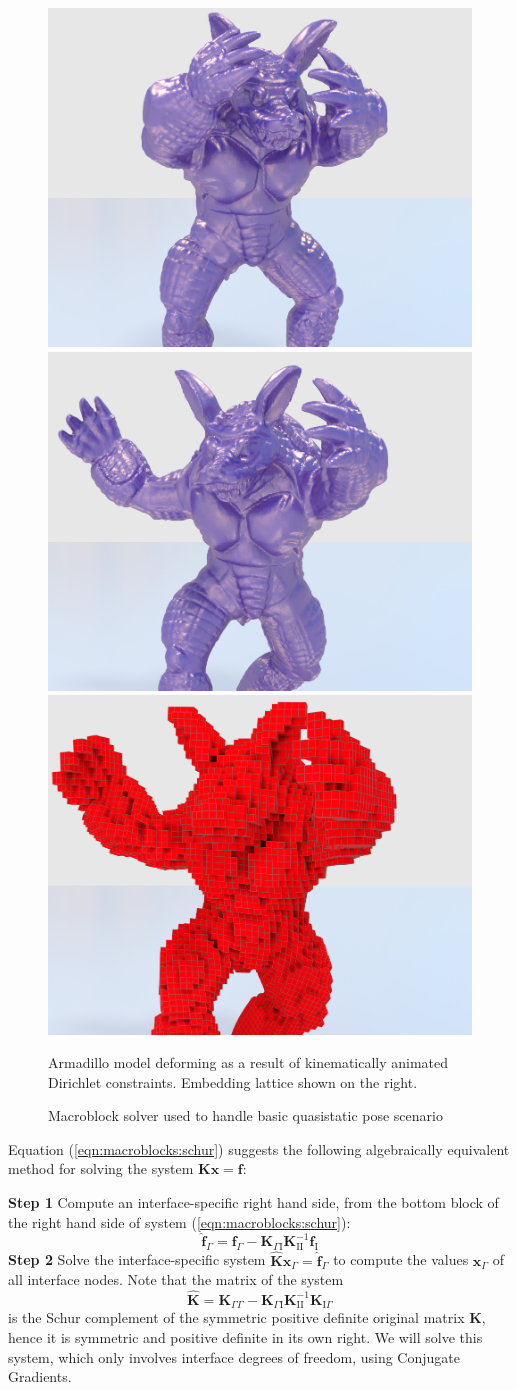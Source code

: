 \begin{figure}
\begin{center}
\includegraphics[width=.32\textwidth]{chapter_macroblocks/images/armadillo1.png}
\includegraphics[width=.32\textwidth]{chapter_macroblocks/images/armadillo2.png}
\includegraphics[width=.32\textwidth]{chapter_macroblocks/images/armadillo3.png}
\end{center} \vspace{-.05in}
\caption{Macroblock solver used to handle basic quasistatic pose
  scenario}{Armadillo model deforming as a result of kinematically
  animated Dirichlet constraints. Embedding lattice shown on the
  right.}
\vspace{-.15in} \label{fig:macroblocks:armadillo-example}
\end{figure}

Equation (\ref{eqn:macroblocks:schur}) suggests the following algebraically
equivalent method for solving the system $\mathbf{Kx=f}$:

\noindent\textbf{Step 1} Compute an interface-specific right hand
side, from the bottom block of the right hand side of system
(\ref{eqn:macroblocks:schur}):
\begin{equation}
\hat{\mathbf{f}}_{\Gamma}=\mathbf{f}_{\Gamma}-\mathbf{K}_{\Gamma\mathrm{I}}\mathbf{K}_{\mathrm{I}\mathrm{I}}^{-1}\mathbf{f}_{\mathrm{I}}
\label{eqn:macroblocks:ItoGamma}
\end{equation}
\noindent\textbf{Step 2} Solve the interface-specific system $\hat{\mathbf{K}}\mathbf{x}_\Gamma=\hat{\mathbf{f}}_{\Gamma}$ to compute the values $\mathbf{x}_\Gamma$ of all
interface nodes. Note that the matrix of the system
\begin{equation}
\hat{\mathbf{K}}=\mathbf{K}_{\Gamma\Gamma}- \mathbf{K}_{\Gamma\mathrm{I}}\mathbf{K}_{\mathrm{I}\mathrm{I}}^{-1}\mathbf{K}_{\mathrm{I}\Gamma}
\label{eqn:macroblocks:KGamma}
\end{equation}
is the Schur complement of the symmetric positive definite original
matrix $\mathbf{K}$, hence it is symmetric and positive definite in
its own right. We will solve this system, which only involves
interface degrees of freedom, using Conjugate Gradients.

